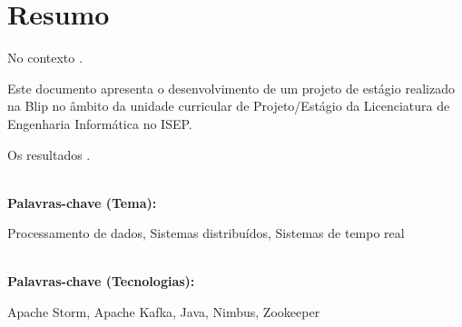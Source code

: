 \titleformat{\chapter}[display]
{\normalfont\bfseries}{}{0pt}{\Huge}

\chapter*{Resumo}

No contexto .

Este documento apresenta o desenvolvimento de um projeto de estágio realizado na Blip no 
âmbito da unidade curricular de Projeto/Estágio da Licenciatura de Engenharia Informática no ISEP. 

Os resultados .

\textbf{\\Palavras-chave (Tema): } 

Processamento de dados, Sistemas distribuídos, Sistemas de tempo real

\textbf{\\Palavras-chave (Tecnologias):}

Apache Storm, Apache Kafka, Java, Nimbus, Zookeeper



